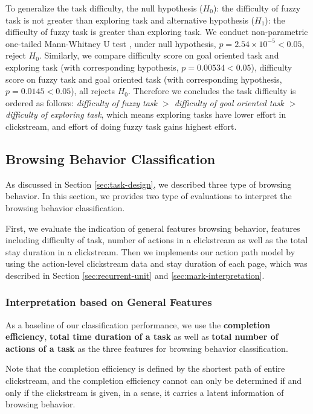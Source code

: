 To generalize the task difficulty, the null hypothesis ($H_0$): the difficulty of fuzzy task is not greater
than exploring task and alternative hypothesis ($H_1$): the difficulty of fuzzy task is greater than
exploring task. We conduct non-parametric one-tailed Mann-Whitney U test \cite{mann1947test}, 
under null hypothesis, $p=2.54\times 10^{-5} < 0.05$, reject $H_0$.
Similarly, we compare difficulty score on goal oriented task and exploring task (with corresponding hypothesis, 
$p=0.00534 < 0.05$), difficulty score on fuzzy task and goal oriented task (with corresponding hypothesis, 
$p=0.0145 < 0.05$), all rejects $H_0$. Therefore we concludes the task difficulty is ordered
as follows: \emph{difficulty of fuzzy task $>$ difficulty of goal oriented task $>$ difficulty of exploring task},
which means exploring tasks have lower effort in clickstream, and effort of doing fuzzy task gains highest effort.

\subsection{Browsing Behavior Classification}

As discussed in Section \ref{sec:task-design}, we described three type of browsing behavior. 
In this section, we provides two type of evaluations to interpret the browsing behavior classification.

First, we evaluate the indication of general features browsing behavior,
features including difficulty of task, number of actions in a clickstream as well as the total stay duration in a clickstream.
Then we implements our action path model by using the action-level clickstream data and stay duration of each page,
which was described in Section \ref{sec:recurrent-unit} and \ref{sec:mark-interpretation}.

\subsubsection{Interpretation based on General Features}
\label{sec:inter-general-feature}

As a baseline of our classification performance, we use the \textbf{completion efficiency}, 
\textbf{total time duration of a task} 
as well as \textbf{total number of actions of a task} as the three features for
browsing behavior classification.

Note that the completion efficiency is defined by the shortest path of entire clickstream,
 and the completion efficiency cannot can only be determined if and only if the clickstream
 is given, in a sense, it carries a latent information of browsing behavior.

